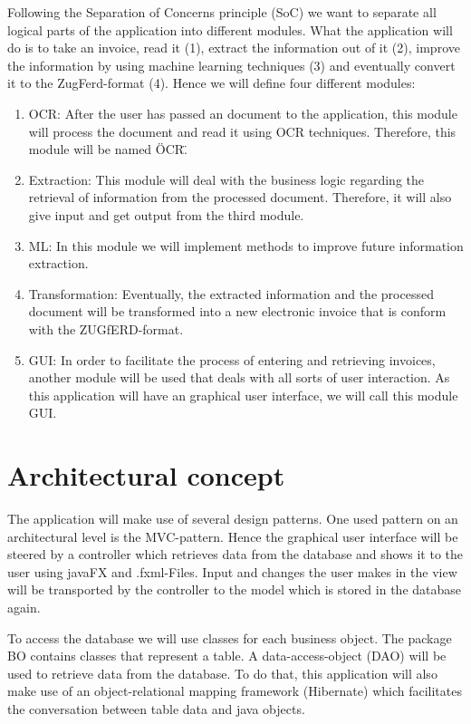 Following the Separation of Concerns principle (SoC) we want to separate all logical parts of the application into different modules.
What the application will do is to take an invoice, read it (1), extract the information out of it (2), improve the information by using machine learning techniques (3) and eventually convert it to the ZugFerd-format (4).
Hence we will define four different modules:
\begin{enumerate}
	\item OCR: After the user has passed an document to the application, this module will process the document and read it using OCR techniques. Therefore, this module will be named \"OCR\".
	\item Extraction: This module will deal with the business logic regarding the retrieval of information from the processed document. Therefore, it will also give input and get output from the third module.
	\item ML: In this module we will implement methods to improve future information extraction.
	\item Transformation: Eventually, the extracted information and the processed document will be transformed into a new electronic invoice that is conform with the ZUGfERD-format.
	\item GUI: In order to facilitate the process of entering and retrieving invoices, another module will be used that deals with all sorts of user interaction. As this application will have an graphical user interface, we will call this module GUI.
\end{enumerate}

\section{Architectural concept}

The application will make use of several design patterns. One used pattern on an architectural level is the MVC-pattern. Hence the graphical user interface will be steered by a controller which retrieves data from the database and shows it to the user using javaFX and .fxml-Files. Input and changes the user makes in the view will be transported by the controller to the model which is stored in the database again.

To access the database we will use classes for each business object. The package BO contains classes that represent a table. A data-access-object (DAO) will be used to retrieve data from the database. To do that, this application will also make use of an object-relational mapping framework (Hibernate) which facilitates the conversation between table data and java objects.

